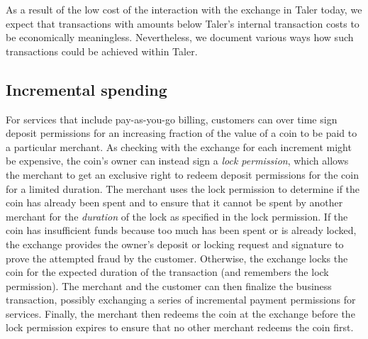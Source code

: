 \documentclass{llncs}
\begin{document}
As a result of the low cost of the interaction with the exchange in Taler
today, we expect that transactions with amounts below Taler's internal
transaction costs to be economically meaningless.  Nevertheless, we
document various ways how such transactions could be achieved within
Taler.



\subsection{Incremental spending}

For services that include pay-as-you-go billing, customers can over
time sign deposit permissions for an increasing fraction of the value
of a coin to be paid to a particular merchant.  As checking with the
exchange for each increment might be expensive, the coin's owner can
instead sign a {\em lock permission}, which allows the merchant to get
an exclusive right to redeem deposit permissions for the coin for a
limited duration.  The merchant uses the lock permission to determine
if the coin has already been spent and to ensure that it cannot be
spent by another merchant for the {\em duration} of the lock as
specified in the lock permission.  If the coin has insufficient funds
because too much has been spent or is
already locked, the exchange provides the owner's deposit or locking
request and signature to prove the attempted fraud by the customer.
Otherwise, the exchange locks the coin for the expected duration of the
transaction (and remembers the lock permission).  The merchant and the
customer can then finalize the business transaction, possibly
exchanging a series of incremental payment permissions for services.
Finally, the merchant then redeems the coin at the exchange before the
lock permission expires to ensure that no other merchant redeems the
coin first.
\end{document}
